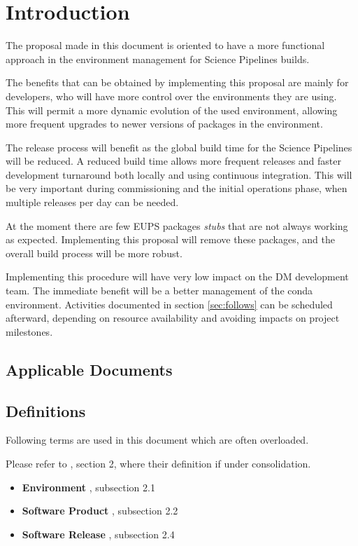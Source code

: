 \section{Introduction} \label{sec:intro}

The proposal made in this document is oriented to have a more functional approach in the environment management for Science Pipelines builds.

The benefits that can be obtained by implementing this proposal are mainly for developers, who will have more control over the environments they are using. 
This will permit a more dynamic evolution of the used environment, allowing more frequent upgrades to newer versions of packages in the environment. 

The release process will  benefit as the global build time for the Science Pipelines  will be reduced. 
A reduced build time allows more frequent releases and faster development turnaround both locally and using continuous integration.
This will be very important during commissioning and the initial operations phase, when multiple releases per day can be needed.

At the moment there are few EUPS packages \textit{stubs} that are not always working as expected.
Implementing this proposal will remove these packages, and the overall build process will be more robust.

Implementing this procedure will have very low impact on the DM development team.
The immediate benefit will be a better management of the conda environment.
Activities documented in section \ref{sec:follows} can be scheduled afterward, depending on resource availability and avoiding impacts on project milestones.


\subsection{Applicable Documents}


\subsection{Definitions}

Following terms are used in this document which are often overloaded.

Please refer to , section 2, where their definition if under consolidation.

\begin{itemize}
\item \textbf{Environment} , subsection 2.1 \label{sec:envdef}
\item \textbf{Software Product} , subsection 2.2 \label{sec:swdef}
\item \textbf{Software Release} , subsection 2.4 \label{sec:defrelease}
\end{itemize}


